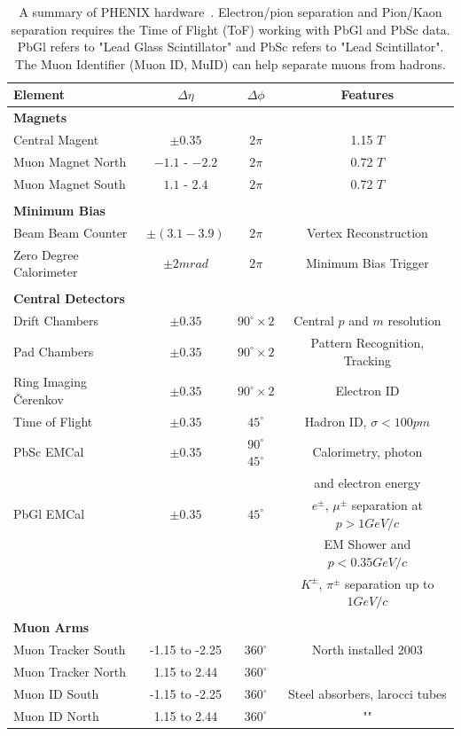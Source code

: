 \begin{table}
  \centering
  \begin{tabular}{lccc}
    \toprule
    \textbf{Element}	& \textbf{$\Delta\eta$}	& \textbf{$\Delta\phi$} & \textbf{Features} \\
    \midrule
    \textbf{Magnets} & & & \\
    Central Magent & $\pm 0.35$ & $2\pi$ & 1.15 $T$ \\ 
    Muon Magnet North & $-1.1$ - $-2.2$ & $2\pi$ & 0.72 $T$ \\
    Muon Magnet South & $1.1$ - $2.4$ & $2\pi$ & 0.72 $T$ \\
    & & & \\
    \textbf{Minimum Bias} & & & \\
    Beam Beam Counter & $\pm(3.1-3.9)$ & $2\pi$ & Vertex Reconstruction \\
    Zero Degree Calorimeter & $\pm 2 mrad$ & $2\pi$ & Minimum Bias Trigger \\
    & & & \\
    \textbf{Central Detectors} & & & \\
    Drift Chambers & $\pm0.35$ & $90^{\circ}\times2$ & Central $p$ and $m$ resolution \\
    Pad Chambers & $\pm0.35$ & $90^{\circ}\times2$ & Pattern Recognition, Tracking \\
    Ring Imaging \v{C}erenkov & $\pm0.35$ & $90^{\circ}\times2$ & Electron ID \\
    Time of Flight & $\pm0.35$ & $45^{\circ}$ & Hadron ID, $\sigma<100pm$ \\
    PbSc EMCal & $\pm0.35$ & $90^{\circ}$ $45^{\circ}$ & Calorimetry, photon \\
    & & & and electron energy \\
    PbGl EMCal & $\pm0.35$ & $45^{\circ}$ & $e^{\pm}$, $\mu^{\pm}$ separation at $p> 1 GeV/c$ \\
    & & & EM Shower and $p < 0.35 GeV/c$ \\
    & & & $K^{\pm}$, $\pi^{\pm}$ separation up to $1 GeV/c$ \\
    & & & \\
    \textbf{Muon Arms} & & & \\
    Muon Tracker South & -1.15 to -2.25 & $360^{\circ}$ & North installed 2003 \\
    Muon Tracker North & 1.15 to 2.44   & $360^{\circ}$ &  \\
    Muon ID South & -1.15 to -2.25 & $360^{\circ}$ & Steel absorbers, larocci
    tubes \\
    Muon ID North & 1.15 to 2.44   & $360^{\circ}$ & "" \\
    \bottomrule 
  \end{tabular}
  \caption{
    A summary of PHENIX hardware~\cite{Adcox2003}. Electron/pion separation and
    Pion/Kaon separation requires the Time of Flight (ToF) working with PbGl and
    PbSc data. PbGl refers to "Lead Glass Scintillator" and PbSc refers to "Lead
    Scintillator". The Muon Identifier (Muon ID, MuID) can help separate muons
    from hadrons. 
  }
  \label{tab:phenix_detector_summary}
\end{table}

